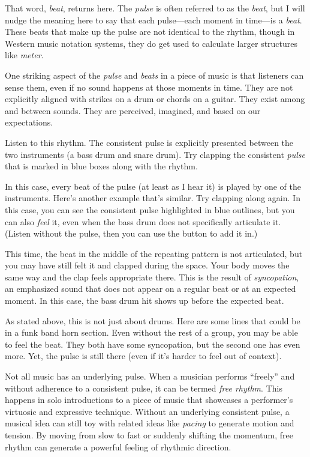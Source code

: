 \documentclass[twoside]{article}
\begin{document}
That word, \emph{beat}, returns here. The \emph{pulse} is often referred
to as the \emph{beat}, but I will nudge the meaning here to say that
each pulse---each moment in time---is a \emph{beat}. These beats that
make up the pulse are not identical to the rhythm, though in Western
music notation systems, they do get used to calculate larger structures
like \emph{meter}.

One striking aspect of the \emph{pulse} and \emph{beats} in a piece of
music is that listeners can sense them, even if no sound happens at
those moments in time. They are not explicitly aligned with strikes on a
drum or chords on a guitar. They exist among and between sounds. They
are perceived, imagined, and based on our expectations.

Listen to this rhythm. The consistent pulse is explicitly presented
between the two instruments (a bass drum and snare drum). Try clapping
the consistent \emph{pulse} that is marked in blue boxes along with the
rhythm.

\hypertarget{example9}{}

In this case, every beat of the pulse (at least as I hear it) is played
by one of the instruments. Here's another example that's similar. Try
clapping along again. In this case, you can see the consistent pulse
highlighted in blue outlines, but you can also \emph{feel} it, even when
the bass drum does not specifically articulate it. (Listen without the
pulse, then you can use the button to add it in.)

\hypertarget{example10}{}

This time, the beat in the middle of the repeating pattern is not
articulated, but you may have still felt it and clapped during the
space. Your body moves the same way and the clap feels appropriate
there. This is the result of \emph{syncopation}, an emphasized sound
that does not appear on a regular beat or at an expected moment. In this
case, the bass drum hit shows up before the expected beat.

As stated above, this is not just about drums. Here are some lines that
could be in a funk band horn section. Even without the rest of a group,
you may be able to feel the beat. They both have some syncopation, but
the second one has even more. Yet, the pulse is still there (even if
it's harder to feel out of context).

\hypertarget{example11a}{}

\hypertarget{example11b}{}

Not all music has an underlying pulse. When a musician performs
``freely'' and without adherence to a consistent pulse, it can be termed
\emph{free rhythm}. This happens in solo introductions to a piece of
music that showcases a performer's virtuosic and expressive technique.
Without an underlying consistent pulse, a musical idea can still toy
with related ideas like \emph{pacing} to generate motion and tension. By
moving from slow to fast or suddenly shifting the momentum, free rhythm
can generate a powerful feeling of rhythmic direction.
\end{document}
